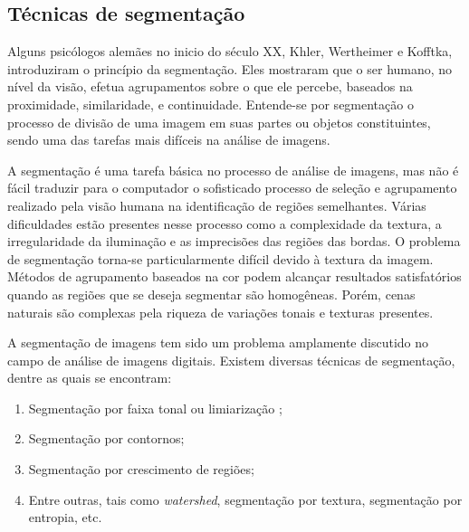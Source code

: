 
\subsection{Técnicas de segmentação}

Alguns psicólogos alemães no inicio do século XX, Khler, Wertheimer e
Kofftka, introduziram o princípio da segmentação. Eles mostraram que o
ser humano, no nível da visão, efetua agrupamentos sobre o que ele
percebe, baseados na proximidade, similaridade, e
continuidade.\cite{93} Entende-se por segmentação o processo de
divisão de uma imagem em suas partes ou objetos constituintes, sendo
uma das tarefas mais difíceis na análise de imagens.\cite{94}

A segmentação é uma tarefa básica no processo de análise de imagens,
mas não é fácil traduzir para o computador o sofisticado processo de
seleção e agrupamento realizado pela visão humana na identificação de
regiões semelhantes. Várias dificuldades estão presentes nesse
processo como a complexidade da textura, a irregularidade da
iluminação e as imprecisões das regiões das bordas. O problema de
segmentação torna-se particularmente difícil devido à textura da
imagem. Métodos de agrupamento baseados na cor podem alcançar
resultados satisfatórios quando as regiões que se deseja segmentar são
homogêneas. Porém, cenas naturais são complexas pela riqueza de
variações tonais e texturas presentes.\cite{95}

A segmentação de imagens tem sido um problema amplamente discutido no
campo de análise de imagens digitais. Existem diversas técnicas de
segmentação, dentre as quais se encontram:

 \begin{enumerate}[label=(\roman{*})]
   \item Segmentação por faixa tonal ou limiarização ;\cite{96,97,98}
   \item Segmentação por contornos;\cite{99,100}
   \item Segmentação por crescimento de regiões;\cite{101,102}
   \item Entre outras, tais como \textit{watershed}, segmentação por
     textura, segmentação por entropia, etc.\cite{103,104,105,106,107}
\end{enumerate}

